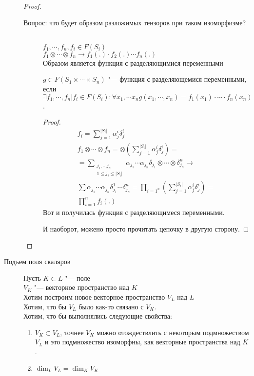 \begin{description}
\begin{proof}
\begin{description}
    \item [Вопрос: что будет образом разложимых тензоров при таком изоморфизме?] \hfill \\
    $f_1, \cdots, f_n, f_i \in F(S_i)$\\
    $f_1 \otimes \cdots \otimes f_n \to f_1(.) \cdot f_2(.) \cdots f_n(.)$\\
    Образом является функция с разделяющимися переменными
    \begin{Def}
    $g \in F(S_1 \times \cdots \times S_n)$ "--- функция с разделяющемися переменными, если
    $\exists f_1, \cdots, f_n| f_i \in F(S_i) \colon \forall x_1, \cdots x_n g(x_1, \cdots, x_n)  = f_1(x_1)\cdot \cdots \cdot f_n(x_n)$.
    \end{Def}
    \begin{proof}
		\begin{gather*}
			f_i = \sum_{j = 1}^{|S_i|}\alpha_j^i\delta_j^i \\
			f_1 \otimes \cdots \otimes f_n = \otimes(\sum_{j = 1}^{|S_i|}\alpha_j^i\delta_j^i) = \\
			= \sum_{\substack{j_1, \cdots j_n \\ 1\le j_i \le |S_i|}}\alpha_{j_1}\cdots \alpha_{j_n}\delta_{j_1} \otimes \cdots \otimes \delta_{j_n}^n \to \\
    \sum \alpha_{j_1}\cdots \alpha_{j_n} \delta_{j_1}^1 \cdots \delta_{j_n}^n = \prod_{i = 1^n}(\sum_{j = 1}^{|S_i|}\alpha_j^i\delta_j^i) =\\
    	\prod_{i = 1}^{n}f_i(.)
	\end{gather*}
    Вот и получилась функция с разделяющимеся переменными.

    И наоборот, можено просто прочитать цепочку в другую сторону.
    \end{proof}
    \end{description}
    \end{proof}
\item [Подъем поля скаляров]
\begin{Def}
Пусть $K \subset L$ "--- поле\\
$V_K$ "--- векторное пространство над $K$\\

Хотим построим новое векторное пространство $V_L$ над $L$\\
Хотим, что бы $V_L$ было как-то связано с $V_K$.\\
Хотим, что бы выполнялись следующие свойства:
\begin{enumerate}
\item $V_K \subset V_L$, точнее $V_K$ можно отождествлить 
с некоторым подмножеством $V_L$ и это подмножество изоморфны, как 
векторные пространства над $K$.
\item $\dim_L V_L = \dim_K V_K$
\end{enumerate}


\end{Def}
\end{description}
